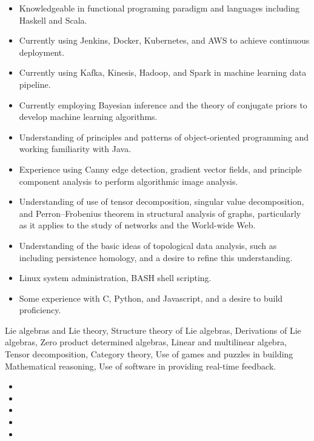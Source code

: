 \documentclass[11pt]{article}
\begin{document}
\newpage

  \begin{itemize}
    \item{}
      Knowledgeable in functional programing paradigm and languages
      including Haskell and Scala.
    \item{}
      Currently using Jenkins, Docker, Kubernetes, and AWS to achieve
      continuous deployment.
    \item{}
      Currently using Kafka, Kinesis, Hadoop, and Spark in machine learning
      data pipeline.
    \item{}
      Currently employing Bayesian inference and the theory of conjugate
      priors to develop machine learning algorithms.
    \item{}
      Understanding of principles and patterns of object-oriented
      programming and working familiarity with Java.
    \item{}
      Experience using Canny edge detection, gradient vector
      fields, and principle component analysis to perform
      algorithmic image analysis.
    \item{}
      Understanding of use of tensor decomposition, singular value
      decomposition, and Perron–Frobenius theorem in structural analysis
      of graphs, particularly as it applies to the study of
      networks and the World-wide Web.
    \item{}
      Understanding of the basic ideas of topological data analysis,
      such as including persistence homology, and a desire to refine
      this understanding.
    \item{}
      Linux system administration, BASH shell scripting.
    \item{}
      Some experience with C, Python, and Javascript, and a desire
      to build proficiency.
  \end{itemize}

  Lie algebras and Lie theory,
  Structure theory of Lie algebras,
  Derivations of Lie algebras,
  Zero product determined algebras,
  Linear and multilinear algebra,
  Tensor decomposition,
  Category theory,
  Use of games and puzzles in building Mathematical reasoning,
  Use of software in providing real-time feedback.

  \small
  \begin{itemize}
    \item{} 
    \item{} 
    \item{} 
    \item{} 
    \item{} 
  \end{itemize}
\end{document}
